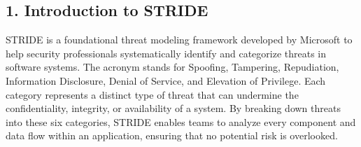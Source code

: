 

\subsection*{1. Introduction to STRIDE}
STRIDE is a foundational threat modeling framework developed by Microsoft to help security professionals systematically identify and categorize threats in software systems\cite{shostack2014}. The acronym stands for Spoofing, Tampering, Repudiation, Information Disclosure, Denial of Service, and Elevation of Privilege. Each category represents a distinct type of threat that can undermine the confidentiality, integrity, or availability of a system. By breaking down threats into these six categories, STRIDE enables teams to analyze every component and data flow within an application, ensuring that no potential risk is overlooked.

